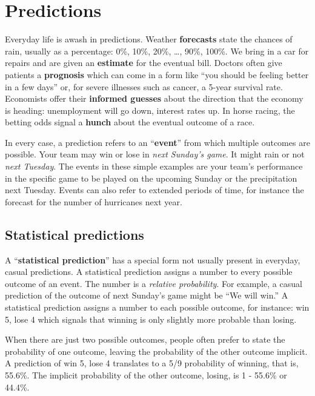 \documentclass[
  letterpaper,
  DIV=11,
  numbers=noendperiod,
  oneside]{scrartcl}
\begin{document}
\newpage

\section{Predictions}\label{sec-predictions}

Everyday life is awash in predictions. Weather \textbf{forecasts} state
the chances of rain, usually as a percentage: 0\%, 10\%, 20\%, \ldots,
90\%, 100\%. We bring in a car for repairs and are given an
\textbf{estimate} for the eventual bill. Doctors often give patients a
\textbf{prognosis} which can come in a form like ``you should be feeling
better in a few days'' or, for severe illnesses such as cancer, a 5-year
survival rate. Economists offer their \textbf{informed guesses} about
the direction that the economy is heading: unemployment will go down,
interest rates up. In horse racing, the betting odds signal a
\textbf{hunch} about the eventual outcome of a race.

In every case, a prediction refers to an ``\textbf{event}'' from which
multiple outcomes are possible. Your team may win or lose in \emph{next
Sunday's game}. It might rain or not \emph{next Tuesday}. The events in
these simple examples are your team's performance in the specific game
to be played on the upcoming Sunday or the precipitation next Tuesday.
Events can also refer to extended periods of time, for instance the
forecast for the number of hurricanes next year.

\subsection{Statistical predictions}\label{statistical-predictions}

A ``\textbf{statistical prediction}'' has a special form not usually
present in everyday, casual predictions. A statistical prediction
assigns a number to every possible outcome of an event. The number is a
\emph{relative probability}. For example, a casual prediction of the
outcome of next Sunday's game might be ``We will win.'' A statistical
prediction assigns a number to each possible outcome, for instance: win
5, lose 4 which signals that winning is only slightly more probable than
losing.

When there are just two possible outcomes, people often prefer to state
the probability of one outcome, leaving the probability of the other
outcome implicit. A prediction of win 5, lose 4 translates to a 5/9
probability of winning, that is, 55.6\%. The implicit probability of the
other outcome, losing, is 1 - 55.6\% or 44.4\%.
\end{document}
